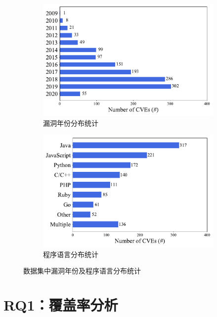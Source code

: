 \begin{figure}[!t]
    \centering
    \begin{subfigure}[b]{0.45\textwidth}
    \centering
    \includegraphics[scale=0.46]{res/rq0-year.pdf}
    \caption{漏洞年份分布统计}\label{fig:rq0-year}
    \end{subfigure}
    \begin{subfigure}[b]{0.45\textwidth}
    \centering
    \includegraphics[scale=0.46]{res/rq0-language.pdf}
    \caption{程序语言分布统计}\label{fig:rq0-language}
    \end{subfigure}
    \caption{数据集中漏洞年份及程序语言分布统计}\label{fig:dataset}
\end{figure}

\section{RQ1：覆盖率分析}\label{sec:coverage}

